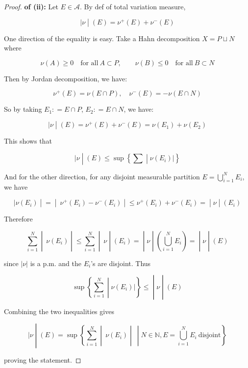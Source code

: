 \documentclass{qlnotes-export}
\begin{document}
\begin{proof}

\textbf{of (ii):} Let \(E \in \mathcal{A}\). By def of total variation measure,

\[\left. |\nu \middle| (E) = \nu^{+}(E) + \nu^{-}(E) \right.\]

One direction of the equality is easy. Take a Hahn decomposition \(X = P \sqcup N\) where

\[\nu(A) \geq 0\quad\text{for all}\ A \subset P,\qquad\nu(B) \leq 0\quad\text{for all}\ B \subset N\]

Then by Jordan decomposition, we have:

\[\nu^{+}(E) = \nu(E \cap P),\quad\nu^{-}(E) = - \nu(E \cap N)\]

So by taking \(E_{1}: = E \cap P\), \(E_{2}: = E \cap N\), we have:

\[\left. |\nu \middle| (E) = \nu^{+}(E) + \nu^{-}(E) = \nu(E_{1}) + \nu(E_{2}) \right.\]

This shows that

\[\left. |\nu \middle| (E) \leq \sup\left\{ \sum \middle| \nu(E_{i})| \right\} \right.\]

And for the other direction, for any disjoint measurable partition \(E = \bigcup_{i = 1}^{N}E_{i}\), we have

\[\left. |\nu(E_{i}) \middle| = \middle| \ \nu^{+}(E_{i}) - \nu^{-}(E_{i}) \middle| \leq \nu^{+}(E_{i}) + \nu^{-}(E_{i}) = \middle| \nu \middle| (E_{i}) \right.\]

Therefore

\[\left. \sum\limits_{i = 1}^{N} \middle| \ \nu(E_{i}) \middle| \leq \sum\limits_{i = 1}^{N} \middle| \ \nu \middle| (E_{i}) = \middle| \nu \middle| (\bigcup\limits_{i = 1}^{N}E_{i}) = \middle| \nu \middle| (E) \right.\]

since \(|\nu|\) is a p.m. and the \(E_{i}\)'s are disjoint. Thus

\[\left. \sup\left\{ \sum\limits_{i = 1}^{N} \middle| \nu(E_{i})| \right\} \leq \middle| \nu \middle| (E) \right.\]

Combining the two inequalities gives

\[\left. |\nu \middle| (E) = \sup\left\{ \sum\limits_{i = 1}^{N} \middle| \ \nu(E_{i}) \middle| \  \middle| N \in {\mathbb{N}},E = \bigcup\limits_{i = 1}^{N}E_{i}\ \text{disjoint} \right\} \right.\]

proving the statement.

\end{proof}
\end{document}

